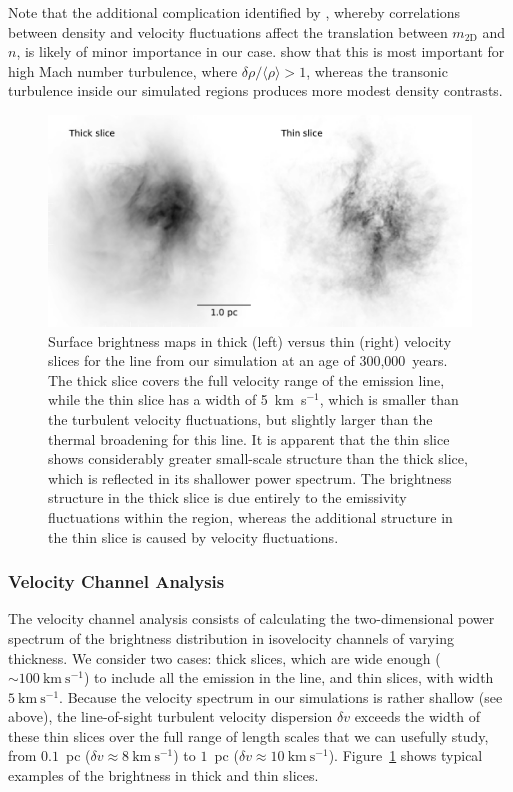 \documentclass[useAMS,usenatbib]{mn2e}
\begin{document}
Note that the additional complication identified by \citet {2004ApJ...604..196B}, 
whereby correlations between density and velocity fluctuations affect the 
translation between \(m_{\mathrm{2D}}\) and \(n\), 
is likely of minor importance in our case.  
\citet {2007MNRAS.381.1733E} show that this is most important
for high Mach number turbulence, where \(\delta\rho/\langle \rho \rangle > 1\),
whereas the transonic turbulence inside our simulated \hii{} regions
produces more modest density contrasts. 
\begin{figure}
\centering
\includegraphics[width=\linewidth]{o3-thick-thin}
 \caption{Surface brightness maps in thick (left) versus thin (right) 
    velocity slices for the \oiii{} line from our simulation
    at an age of 300,000~years.  
    The thick slice covers the full velocity range of the emission line,
    while the thin slice has a width of 5~km~s$^{-1}$,
    which is smaller than the turbulent velocity fluctuations,
    but slightly larger than the thermal broadening for this line.
    It is apparent that the thin slice shows considerably greater
    small-scale structure than the thick slice,
    which is reflected in its shallower power spectrum.
    The brightness structure in the thick slice is due entirely to
    the emissivity fluctuations within the \hii{} region, 
    whereas the additional structure in the thin slice is caused by
    velocity fluctuations.
  }
\label{fig:o3-thick-thin}
\end{figure}

\subsubsection{Velocity Channel Analysis}
\label{sssec:vca2}
The velocity channel analysis consists of calculating the
two-dimensional power spectrum of the brightness distribution
in isovelocity channels of varying thickness.  
We consider two cases: thick slices,
which are wide enough (\(\sim 100~\mathrm{km\ s^{-1}}\))
to include all the emission in the line,
and thin slices, with width \(5~\mathrm{km\ s^{-1}}\). 
Because the velocity spectrum in our simulations is rather shallow (see above),
the line-of-sight turbulent velocity dispersion \(\delta v\)
exceeds the width of these thin slices
over the full range of length scales that we can usefully study,
from \(0.1\)~pc (\(\delta v \approx 8~\mathrm{km\ s^{-1}}\))
to \(1\)~pc (\(\delta v \approx 10~\mathrm{km\
  s^{-1}}\)). Figure~\ref{fig:o3-thick-thin} shows typical examples of
the \oiii{} brightness in thick and thin slices.
\end{document}
